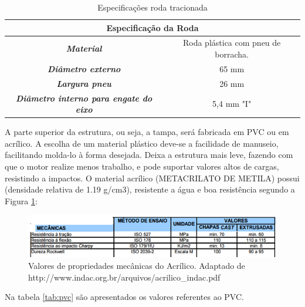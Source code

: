 			\begin{table}[H]
				\centering
				\caption{Especificações roda tracionada}
				\label{tab:especificacoes_roda}
				\begin{tabular}{|c|c|}
					\hline
					\multicolumn{2}{|c|}{\cellcolor[HTML]{C0C0C0}\textbf{Especificação da Roda}}                 \\ \hline
					\textit{\textbf{Material}}                             & Roda plástica com pneu de borracha. \\ \hline
					\textit{\textbf{Diâmetro externo}}                     & 65 mm                               \\ \hline
					\textit{\textbf{Largura pneu}}                         & 26 mm                               \\ \hline
					\textit{\textbf{Diâmetro interno para engate do eixo}} & 5,4 mm "I"                          \\ \hline
				\end{tabular}
			\end{table}

			A parte superior da estrutura, ou seja, a tampa, será fabricada em PVC ou em acrílico. A escolha de um material plástico deve-se a facilidade de manuseio, facilitando molda-lo à forma desejada. Deixa a estrutura mais leve, fazendo com que o motor realize menos trabalho, e pode suportar valores altos de cargas, resistindo a impactos. O material acrílico (METACRILATO DE METILA) possui (densidade relativa de 1.19 g/cm3), resistente a água e boa resistência segundo a Figura \ref{img:acrilico}:

			\begin{figure}[H]
				\centering
				\includegraphics[scale=0.8]{figuras/tabela_acrilico.png}
				\caption[Valores de propriedades mecânicas do Acrílico]{Valores de propriedades mecânicas do Acrílico. Adaptado de http://www.indac.org.br/arquivos/acrilico\_indac.pdf}
				\label{img:acrilico}
			\end{figure}

			Na tabela \ref{tab:pvc} são apresentados os valores referentes ao PVC.

